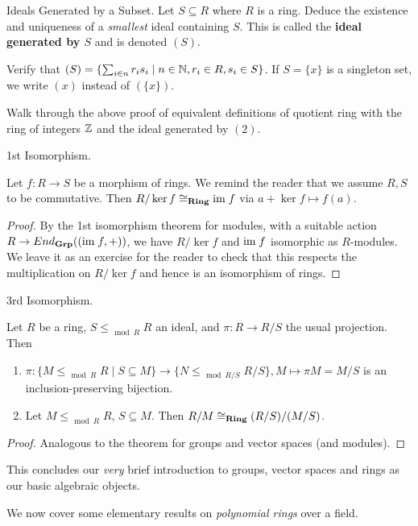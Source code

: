 \documentclass[../../book.tex]{subfiles}
\begin{document}
\begin{ex} Ideals Generated by a Subset. 
    Let $S \subseteq R$ where $R$ is a ring. 
    Deduce the existence and uniqueness of a \emph{smallest} ideal containing $S$.
    This is called the \textbf{ideal generated by $S$} and 
    is denoted $(S)$. 
    
    Verify that $(S) = 
    \{ \sum_{i \in n} r_i s_i \mid n \in \mathbb{N}, r_i \in R, s_i \in S\}$. 
    If $S = \{x\}$ is a singleton set, we write $(x)$ instead of $(\{x\})$. 
\end{ex}

\begin{ex}
    
    Walk through the above proof of equivalent definitions of quotient ring
    with the ring of integers $\mathbb{Z}$ and the ideal generated by $(2)$. 
    
\end{ex}

\begin{thm} 1st Isomorphism.
    
    Let $f : R \to S$ be a morphism of rings. 
    We remind the reader that we assume $R, S$ to be commutative. 
    Then $R/\ker f \cong_{\mathbf{Ring}} \textnormal{im}\; f$ via $a + \ker f \mapsto f(a)$. 
\end{thm}
\begin{proof}
    By the 1st isomorphism theorem for modules, 
    with a suitable action $R \to End_{\mathbf{Grp}}((\textnormal{im}\; f, +))$,
    we have $R/\ker f$ and $\textnormal{im}\; f$ isomorphic as $R$-modules. 
    We leave it as an exercise for the reader to check that
    this respects the multiplication on $R/\ker f$ and
    hence is an isomorphism of rings.
\end{proof}
\begin{thm} 3rd Isomorphism.

    Let $R$ be a ring, $S \leq_{\mod{R}} R$ an ideal, and
    $\pi : R \to R/S$ the usual projection. 
    Then
    \begin{enumerate}
        \item $\pi : 
        \{M \leq_{\mod{R}} R \mid S \subseteq M\} \to \{N \leq_{\mod{R/S}} R/S\}, 
        M \mapsto \pi M = M/S$ is an inclusion-preserving bijection.
        \item Let $M \leq_{\mod{R}} R$, $S \subseteq M$. 
        Then $R / M \cong_{\mathbf{Ring}} (R / S) / (M / S)$. 
    \end{enumerate}
\end{thm}
\begin{proof}
    Analogous to the theorem for groups and vector spaces (and modules). 
\end{proof}

\begin{rmk}
    This concludes our \emph{very} brief introduction to 
    groups, vector spaces and rings as our basic algebraic objects. 
    
    We now cover some elementary results on \emph{polynomial rings} over a field.
\end{rmk}
\end{document}
